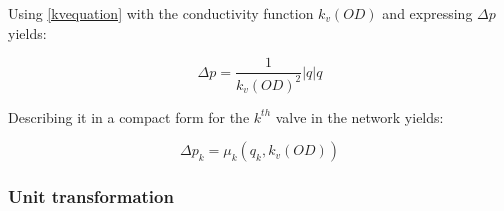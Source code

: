 Using \eqref{kvequation} with the conductivity function $k_v(OD)$ and expressing $\Delta p$ yields: 

\begin{equation}
\label{CompleteValveModel}
 \Delta p = \frac{1}{k_v(OD)^2} |q| q
\end{equation}

Describing it in a compact form for the $k^{th}$ valve in the network yields: 

\begin{equation}
\label{CompactValveModel}
 \Delta p_k = \mu_k(q_k,k_v(OD)) 
\end{equation}

\subsubsection{Unit transformation}


\label{unittransform}


 
 
 